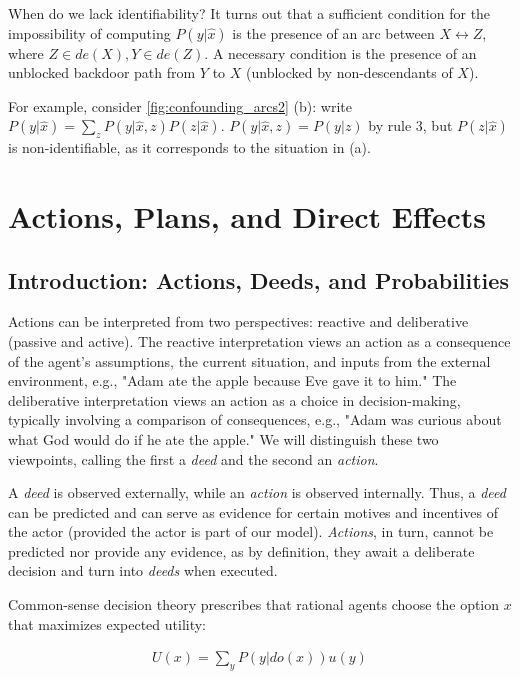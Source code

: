\documentclass[fleqn]{article}
\numberwithin{equation}{section}
\numberwithin{theorem}{section}
\numberwithin{figure}{section}
\numberwithin{lemma}{section}
\numberwithin{corollary}{section}
\begin{document}
When do we lack identifiability? It turns out that a sufficient condition for the impossibility of computing $P(y|\hat x)$ is the presence of an arc between $X \leftrightarrow Z$, where $Z \in de(X), Y \in de(Z)$. A necessary condition is the presence of an unblocked backdoor path from $Y$ to $X$ (unblocked by non-descendants of $X$).

For example, consider \ref{fig:confounding_arcs2} (b): write $P(y|\hat x) = \sum\limits_{z} P(y|\hat x, z) P(z | \hat x)$. $P(y|\hat x, z) = P(y|z)$ by rule 3, but $P(z | \hat x)$ is non-identifiable, as it corresponds to the situation in (a).

\section{Actions, Plans, and Direct Effects}

\subsection*{Introduction: Actions, Deeds, and Probabilities}

Actions can be interpreted from two perspectives: reactive and deliberative (passive and active). The reactive interpretation views an action as a consequence of the agent's assumptions, the current situation, and inputs from the external environment, e.g., "Adam ate the apple because Eve gave it to him." The deliberative interpretation views an action as a choice in decision-making, typically involving a comparison of consequences, e.g., "Adam was curious about what God would do if he ate the apple." We will distinguish these two viewpoints, calling the first a \textit{deed} and the second an \textit{action}.

A \textit{deed} is observed externally, while an \textit{action} is observed internally. Thus, a \textit{deed} can be predicted and can serve as evidence for certain motives and incentives of the actor (provided the actor is part of our model). \textit{Actions}, in turn, cannot be predicted nor provide any evidence, as by definition, they await a deliberate decision and turn into \textit{deeds} when executed.

Common-sense decision theory prescribes that rational agents choose the option $x$ that maximizes expected utility:

\begin{align}
	U(x) = \sum\limits_{y}P(y|do(x))u(y)
\end{align} 
\end{document}
